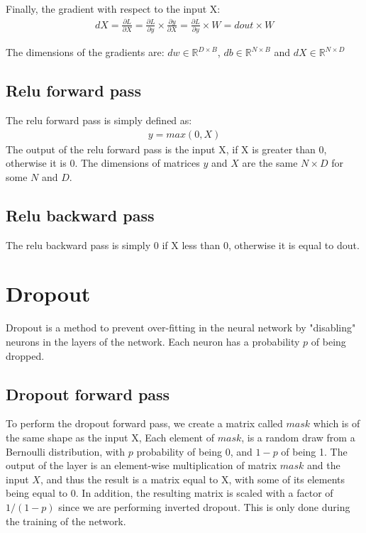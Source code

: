 \documentclass[12pt,twoside]{article}
\begin{document}
Finally, the gradient with respect to the input X:
\begin{align}
dX = \frac{\partial L}{\partial X} = \frac{\partial L}{\partial y} \times \frac{\partial y}{\partial X} = \frac{\partial L}{\partial y} \times W = dout \times W
\end{align}

The dimensions of the gradients are: $dw \in \mathbb{R}^{D \times B}$, $db \in \mathbb{R}^{N \times B}$ and $dX \in \mathbb{R}^{N \times D}$

\subsection{Relu forward pass}

The relu forward pass is simply defined as:
\begin{align}
y = max(0,X)
\end{align}
The output of the relu forward pass is the input X, if X is greater than 0, otherwise it is 0. The dimensions of matrices $y$ and $X$ are the same $N \times D$ for some $N$ and $D$.

\subsection{Relu backward pass}

The relu backward pass is simply 0 if X less than 0, otherwise it is equal to dout.

\section{Dropout}
Dropout is a method to prevent over-fitting in the neural network by "disabling" neurons in the layers of the network. Each neuron has a probability $p$ of being dropped.

\subsection{Dropout forward pass}
To perform the dropout forward pass, we create a matrix called $mask$ which is of the same shape as the input X, Each element of $mask$, is a random draw from a Bernoulli distribution, with $p$ probability of being $0$, and $1-p$ of being 1. The output of the layer is an element-wise multiplication of matrix $mask$ and the input $X$, and thus the result is a matrix equal to X, with some of its elements being equal to 0. In addition, the resulting matrix is scaled with a factor of $1/(1-p)$ since we are performing inverted dropout. This is only done during the training of the network.
\end{document}
